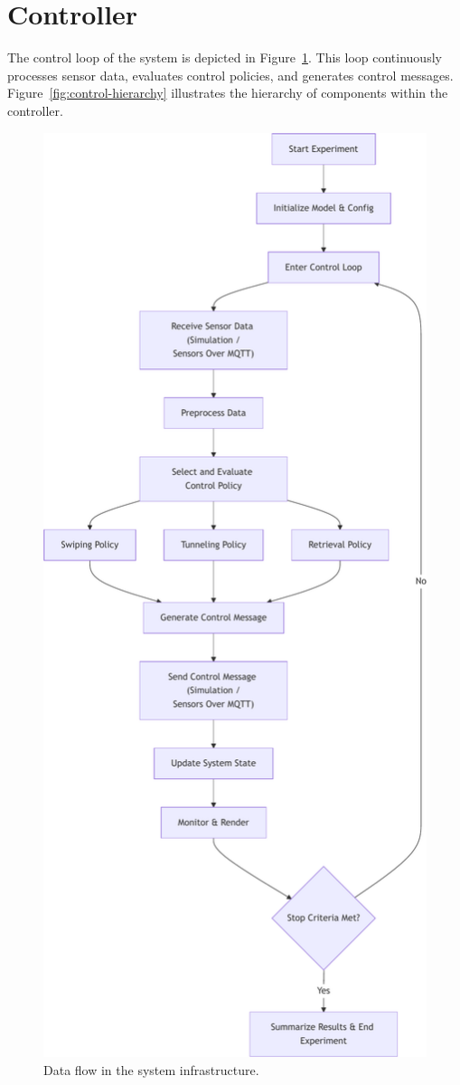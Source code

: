 \section{Controller}
The control loop of the system is depicted in Figure~\ref{fig:control-flow}.
This loop continuously processes sensor data, evaluates control policies, and generates control messages.
Figure~\ref{fig:control-hierarchy} illustrates the hierarchy of components within the controller.

\begin{figure}
    \centering
    \includegraphics[height=\textheight]{figures/diagrams/control-flow}
    \caption{Data flow in the system infrastructure.}
    \label{fig:control-flow}
\end{figure}


